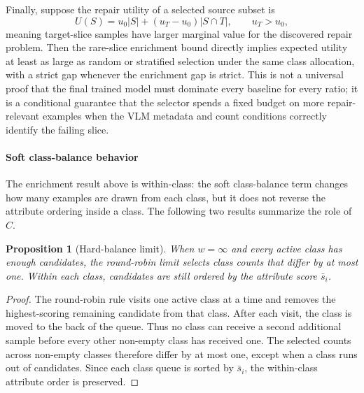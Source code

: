 \documentclass{article}
\newtheorem{proposition}{Proposition}
\begin{document}
Finally, suppose the repair utility of a selected source subset is
\begin{equation}
\label{eq:repair-utility}
U(S)=u_0 |S| + (u_T-u_0)|S\cap T|,
\qquad u_T>u_0,
\end{equation}
meaning target-slice samples have larger marginal value for the discovered repair problem. Then the rare-slice enrichment bound directly implies expected utility at least as large as random or stratified selection under the same class allocation, with a strict gap whenever the enrichment gap is strict. This is not a universal proof that the final trained model must dominate every baseline for every ratio; it is a conditional guarantee that the selector spends a fixed budget on more repair-relevant examples when the VLM metadata and count conditions correctly identify the failing slice.

\paragraph{Soft class-balance behavior}
The enrichment result above is within-class: the soft class-balance term changes how many examples are drawn from each class, but it does not reverse the attribute ordering inside a class. The following two results summarize the role of $C$.

\begin{proposition}[Hard-balance limit]
\label{prop:hard-balance-limit}
When $w=\infty$ and every active class has enough candidates, the round-robin limit selects class counts that differ by at most one. Within each class, candidates are still ordered by the attribute score $\bar{s}_i$.
\end{proposition}

\begin{proof}
The round-robin rule visits one active class at a time and removes the highest-scoring remaining candidate from that class. After each visit, the class is moved to the back of the queue. Thus no class can receive a second additional sample before every other non-empty class has received one. The selected counts across non-empty classes therefore differ by at most one, except when a class runs out of candidates. Since each class queue is sorted by $\bar{s}_i$, the within-class attribute order is preserved.
\end{proof}
\end{document}
